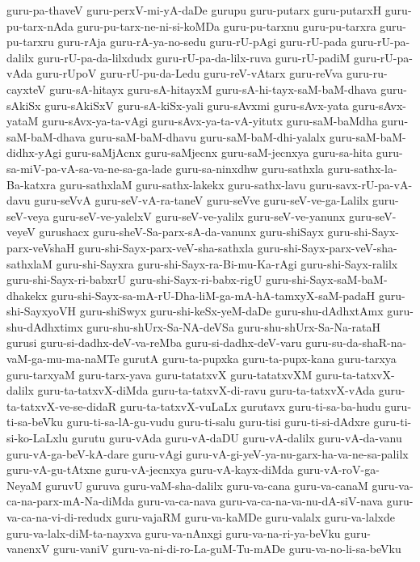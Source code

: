 {guru-pa-thaveV
guru-perxV-mi-yA-daDe
gurupu
guru-putarx
guru-putarxH
guru-pu-tarx-nAda
guru-pu-tarx-ne-ni-si-koMDa
guru-pu-tarxnu
guru-pu-tarxra
guru-pu-tarxru
guru-rAja
guru-rA-ya-no-sedu
guru-rU-pAgi
guru-rU-pada
guru-rU-pa-dalilx
guru-rU-pa-da-lilxdudx
guru-rU-pa-da-lilx-ruva
guru-rU-padiM
guru-rU-pa-vAda
guru-rUpoV
guru-rU-pu-da-Ledu
guru-reV-vAtarx
guru-reVva
guru-ru-cayxteV
guru-sA-hitayx
guru-sA-hitayxM
guru-sA-hi-tayx-saM-baM-dhava
guru-sAkiSx
guru-sAkiSxV
guru-sA-kiSx-yali
guru-sAvxmi
guru-sAvx-yata
guru-sAvx-yataM
guru-sAvx-ya-ta-vAgi
guru-sAvx-ya-ta-vA-yitutx
guru-saM-baMdha
guru-saM-baM-dhava
guru-saM-baM-dhavu
guru-saM-baM-dhi-yalalx
guru-saM-baM-didhx-yAgi
guru-saMjAcnx
guru-saMjecnx
guru-saM-jecnxya
guru-sa-hita
guru-sa-miV-pa-vA-sa-va-ne-sa-ga-lade
guru-sa-ninxdhw
guru-sathxla
guru-sathx-la-Ba-katxra
guru-sathxlaM
guru-sathx-lakekx
guru-sathx-lavu
guru-savx-rU-pa-vA-davu
guru-seVvA
guru-seV-vA-ra-taneV
guru-seVve
guru-seV-ve-ga-Lalilx
guru-seV-veya
guru-seV-ve-yalelxV
guru-seV-ve-yalilx
guru-seV-ve-yanunx
guru-seV-veyeV
gurushacx
guru-sheV-Sa-parx-sA-da-vanunx
guru-shiSayx
guru-shi-Sayx-parx-veVshaH
guru-shi-Sayx-parx-veV-sha-sathxla
guru-shi-Sayx-parx-veV-sha-sathxlaM
guru-shi-Sayxra
guru-shi-Sayx-ra-Bi-mu-Ka-rAgi
guru-shi-Sayx-ralilx
guru-shi-Sayx-ri-babxrU
guru-shi-Sayx-ri-babx-rigU
guru-shi-Sayx-saM-baM-dhakekx
guru-shi-Sayx-sa-mA-rU-Dha-liM-ga-mA-hA-tamxyX-saM-padaH
guru-shi-SayxyoVH
guru-shiSwyx
guru-shi-keSx-yeM-daDe
guru-shu-dAdhxtAmx
guru-shu-dAdhxtimx
guru-shu-shUrx-Sa-NA-deVSa
guru-shu-shUrx-Sa-Na-rataH
gurusi
guru-si-dadhx-deV-va-reMba
guru-si-dadhx-deV-varu
guru-su-da-shaR-na-vaM-ga-mu-ma-naMTe
gurutA
guru-ta-pupxka
guru-ta-pupx-kana
guru-tarxya
guru-tarxyaM
guru-tarx-yava
guru-tatatxvX
guru-tatatxvXM
guru-ta-tatxvX-dalilx
guru-ta-tatxvX-diMda
guru-ta-tatxvX-di-ravu
guru-ta-tatxvX-vAda
guru-ta-tatxvX-ve-se-didaR
guru-ta-tatxvX-vuLaLx
gurutavx
guru-ti-sa-ba-hudu
guru-ti-sa-beVku
guru-ti-sa-lA-gu-vudu
guru-ti-salu
guru-tisi
guru-ti-si-dAdxre
guru-ti-si-ko-LaLxlu
gurutu
guru-vAda
guru-vA-daDU
guru-vA-dalilx
guru-vA-da-vanu
guru-vA-ga-beV-kA-dare
guru-vAgi
guru-vA-gi-yeV-ya-nu-garx-ha-va-ne-sa-palilx
guru-vA-gu-tAtxne
guru-vA-jecnxya
guru-vA-kayx-diMda
guru-vA-roV-ga-NeyaM
guruvU
guruva
guru-vaM-sha-dalilx
guru-va-cana
guru-va-canaM
guru-va-ca-na-parx-mA-Na-diMda
guru-va-ca-nava
guru-va-ca-na-va-nu-dA-siV-nava
guru-va-ca-na-vi-di-redudx
guru-vajaRM
guru-va-kaMDe
guru-valalx
guru-va-lalxde
guru-va-lalx-diM-ta-nayxva
guru-va-nAnxgi
guru-va-na-ri-ya-beVku
guru-vanenxV
guru-vaniV
guru-va-ni-di-ro-La-guM-Tu-mADe
guru-va-no-li-sa-beVku
}

